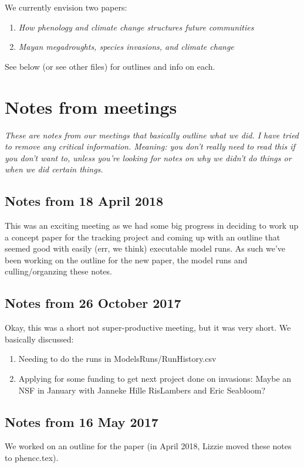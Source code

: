 \documentclass[11pt,a4paper,oneside]{article}
\begin{document}
 We currently envision two papers: 
\begin{enumerate}
\item \emph{How phenology and climate change structures future communities}
\item \emph{Mayan megadroughts, species invasions, and climate change} 
\end{enumerate}
See below (or see other files) for outlines and info on each.

\section{Notes from meetings}
\emph{These are notes from our meetings that basically outline what we did. I have tried to remove any critical information. Meaning: you don't really need to read this if you don't want to, unless you're looking for notes on why we didn't do things or when we did certain things.}

\subsection{Notes from 18 April 2018}
This was an exciting meeting as we had some big progress in deciding to work up a concept paper for the tracking project and coming up with an outline that seemed good with easily (err, we think) executable model runs. As such we've been working on the outline for the new paper, the model runs and culling/organzing these notes.

\subsection{Notes from 26 October 2017}
Okay, this was a short not super-productive meeting, but it was very short. We basically discussed:
\begin{enumerate} 
\item Needing to do the runs in ModelsRuns/RunHistory.csv
\item Applying for some funding to get next project done on invasions: Maybe an NSF in January with Janneke Hille RisLambers and Eric Seabloom?
\end{enumerate} 

\subsection{Notes from 16 May 2017}
We worked on an outline for the paper (in April 2018, Lizzie moved these notes to phencc.tex).
\end{document}
